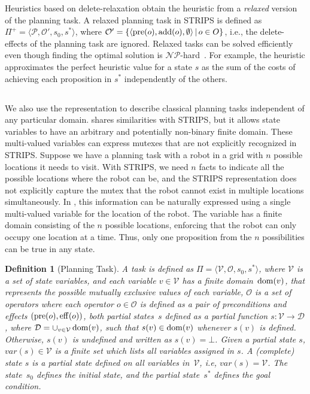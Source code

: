 \documentclass[ppgc,diss,english]{iiufrgs}
\newtheorem{definition}{Definition}
\begin{document}
Heuristics based on delete-relaxation obtain the heuristic from a \emph{relaxed} version of the planning task. A relaxed planning task in STRIPS is defined as $\Pi^{+}=\langle\mathcal{P},\mathcal{O'},s_{0},s^{*}\rangle$, where $\mathcal{O'} = \{ \langle \operatorname{pre}(o), \operatorname{add}(o), \emptyset \rangle \,|\, o \in O \}$, i.e., the delete-effects of the planning task are ignored. Relaxed tasks can be solved efficiently even though finding the optimal solution is $\mathcal{NP}$-hard~\cite{Bylander/1994}. For example, the heuristic \hadd approximates the perfect heuristic value for a state $s$ as the sum of the costs of achieving each proposition in $s^{*}$ independently of the others.

\subsection{\sas}
\label{sec:background-sas}
We also use the \sas representation to describe classical planning tasks independent of any particular domain. \sas shares similarities with STRIPS, but it allows state variables to have an arbitrary and potentially non-binary finite domain. These multi-valued variables can express mutexes that are not explicitly recognized in STRIPS. Suppose we have a planning task with a robot in a grid with $n$ possible locations it needs to visit. With STRIPS, we need $n$ facts to indicate all the possible locations where the robot can be, and the STRIPS representation does not explicitly capture the mutex that the robot cannot exist in multiple locations simultaneously. In \sas, this information can be naturally expressed using a single multi-valued variable for the location of the robot. The variable has a finite domain consisting of the $n$ possible locations, enforcing that the robot can only occupy one location at a time. Thus, only one proposition from the $n$ possibilities can be true in any state.

\begin{definition}[\sas Planning Task]\label{def:sas}
A \sas task is defined as $\Pi=\langle\mathcal{V},\mathcal{O},s_0,s^*\rangle$, where $\mathcal{V}$ is a set of state variables, and each variable $v\in \mathcal{V}$ has a finite domain~$\operatorname{dom}(v)$, that represents the possible mutually exclusive values of each variable, $\mathcal{O}$ is a set of operators where each operator $o \in \mathcal{O}$ is defined as a pair of preconditions and effects $(\operatorname{pre}(o),\operatorname{eff}(o))$, both partial states~$s$ defined as a partial function $s:\mathcal{V}\rightarrow \mathcal{D}$, where $\mathcal{D}=\cup_{v\in \mathcal{V}}\operatorname{dom}(v)$, such that $s(v)\in \operatorname{dom}(v)$ whenever $s(v)$ is defined. Otherwise, $s(v)$ is undefined and written as $s(v)=\bot$. Given a partial state $s$, $var(s) \in \mathcal{V}$ is a finite set which lists all variables assigned in $s$. A (complete) state $s$ is a partial state defined on all variables in~$\mathcal{V}$, i.e, $var(s) = \mathcal{V}$. The state~$s_0$ defines the initial state, and the partial state~$s^*$ defines the goal condition.
\end{definition}
\end{document}
